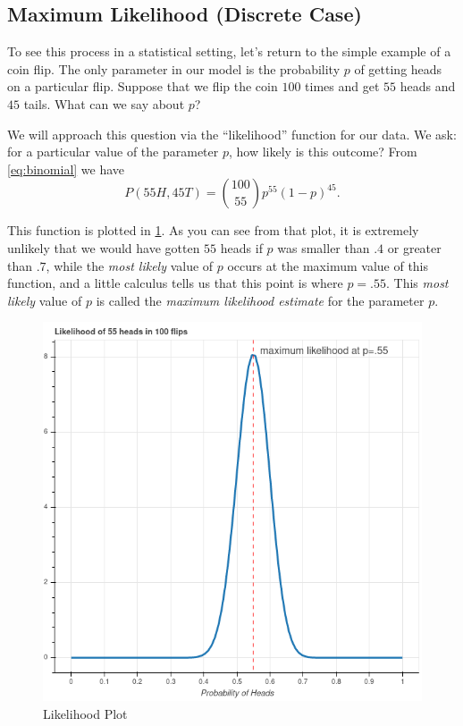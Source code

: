 \documentclass[
  oneside]{scrbook}
\begin{document}
\hypertarget{sec:mlcoin}{%
\subsection{Maximum Likelihood (Discrete Case)}\label{sec:mlcoin}}

To see this process in a statistical setting, let's return to the simple
example of a coin flip. The only parameter in our model is the
probability \(p\) of getting heads on a particular flip. Suppose that we
flip the coin \(100\) times and get \(55\) heads and \(45\) tails. What
can we say about \(p\)?

We will approach this question via the ``likelihood'' function for our
data. We ask: for a particular value of the parameter \(p\), how likely
is this outcome? From \cref{eq:binomial} we have \[
P(55H,45T)=\binom{100}{55}p^{55}(1-p)^{45}.
\]

This function is plotted in \cref{fig:beta}. As you can see from that
plot, it is extremely unlikely that we would have gotten \(55\) heads if
\(p\) was smaller than \(.4\) or greater than \(.7\), while the
\emph{most likely} value of \(p\) occurs at the maximum value of this
function, and a little calculus tells us that this point is where
\(p=.55\). This \emph{most likely} value of \(p\) is called the
\emph{maximum likelihood estimate} for the parameter \(p\).

\begin{figure}
\hypertarget{fig:beta}{%
\centering
\includegraphics{img/beta.png}
\caption{Likelihood Plot}\label{fig:beta}
}
\end{figure}
\end{document}
